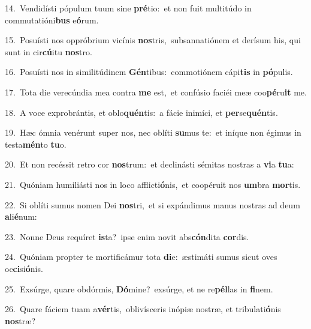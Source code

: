 {\numbfont\textcolor{\numbcolor}{14.}}~Vendidísti pópulum tuum sine \textbf{pré}\-tio:~\star et non fuit multitúdo in commutatióni\textbf{bus} e\-\textbf{ó}\-rum.\par
{\numbfont\textcolor{\numbcolor}{15.}}~Posuísti nos oppróbrium vicínis \textbf{nos}\-tris,~\star subsannatiónem et derísum his, qui sunt in cir\-\textbf{cú}\-itu \textbf{nos}\-tro.\par
{\numbfont\textcolor{\numbcolor}{16.}}~Posuísti nos in similitúdinem \textbf{Gén}\-tibus:~\star commotiónem cápi\textbf{tis} in \textbf{pó}\-pulis.\par
{\numbfont\textcolor{\numbcolor}{17.}}~Tota die verecúndia mea contra \textbf{me} est,~\star et confúsio faciéi meæ coo\-\textbf{pé}\-ru\textbf{it} me.\par
{\numbfont\textcolor{\numbcolor}{18.}}~A voce exprobrántis, et oblo\-\textbf{quén}\-tis:~\star a fácie inimíci, et \textbf{per}\-se\-\textbf{quén}\-tis.\par
{\numbfont\textcolor{\numbcolor}{19.}}~Hæc ómnia venérunt super nos, nec oblíti \textbf{su}\-mus te:~\star et iníque non égimus in testa\-\textbf{mén}\-to \textbf{tu}\-o.\par
{\numbfont\textcolor{\numbcolor}{20.}}~Et non recéssit retro cor \textbf{nos}\-trum:~\star et declinásti sémitas nostras a \textbf{vi}\-a \textbf{tu}\-a:\par
{\numbfont\textcolor{\numbcolor}{21.}}~Quóniam humiliásti nos in loco afflicti\-\textbf{ó}\-nis,~\star et coopéruit nos \textbf{um}\-bra \textbf{mor}\-tis.\par
{\numbfont\textcolor{\numbcolor}{22.}}~Si oblíti sumus nomen Dei \textbf{nos}\-tri,~\star et si expándimus manus nostras ad deum \textbf{a}\-li\-\textbf{é}\-num:\par
{\numbfont\textcolor{\numbcolor}{23.}}~Nonne Deus requíret \textbf{is}\-ta?~\star ipse enim novit abs\-\textbf{cón}\-dita \textbf{cor}\-dis.\par
{\numbfont\textcolor{\numbcolor}{24.}}~Quóniam propter te mortificámur tota \textbf{di}\-e:~\star æstimáti sumus sicut oves oc\-\textbf{ci}\-si\-\textbf{ó}\-nis.\par
{\numbfont\textcolor{\numbcolor}{25.}}~Exsúrge, quare obdórmis, \textbf{Dó}\-mine?~\star exsúrge, et ne re\-\textbf{pél}\-las in \textbf{fi}\-nem.\par
{\numbfont\textcolor{\numbcolor}{26.}}~Quare fáciem tuam a\-\textbf{vér}\-tis,~\star oblivísceris inópiæ nostræ, et tribulati\-\textbf{ó}\-nis \textbf{nos}\-træ?\par
